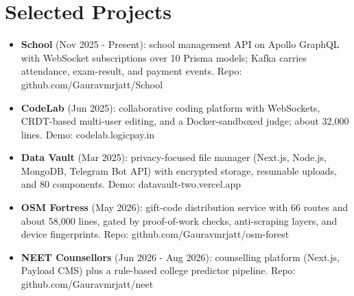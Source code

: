 \documentclass[11pt,a4paper,sans]{moderncv}
\begin{document}
\vspace{1pt}



\section{Selected Projects}
\vspace{1pt}
\begin{itemize}
    \item {\textbf{School} (Nov 2025 - Present): school management API on Apollo GraphQL with WebSocket subscriptions over 10 Prisma models; Kafka carries attendance, exam-result, and payment events. Repo: github.com/Gauravmrjatt/School}
    \item {\textbf{CodeLab} (Jun 2025): collaborative coding platform with WebSockets, CRDT-based multi-user editing, and a Docker-sandboxed judge; about 32,000 lines. Demo: codelab.logicpay.in}
    \item {\textbf{Data Vault} (Mar 2025): privacy-focused file manager (Next.js, Node.js, MongoDB, Telegram Bot API) with encrypted storage, resumable uploads, and 80 components. Demo: datavault-two.vercel.app}
    \item {\textbf{OSM Fortress} (May 2026): gift-code distribution service with 66 routes and about 58,000 lines, gated by proof-of-work checks, anti-scraping layers, and device fingerprints. Repo: github.com/Gauravmrjatt/osm-forest}
    \item {\textbf{NEET Counsellors} (Jun 2026 - Aug 2026): counselling platform (Next.js, Payload CMS) plus a rule-based college predictor pipeline. Repo: github.com/Gauravmrjatt/neet}
\end{itemize}
\end{document}
